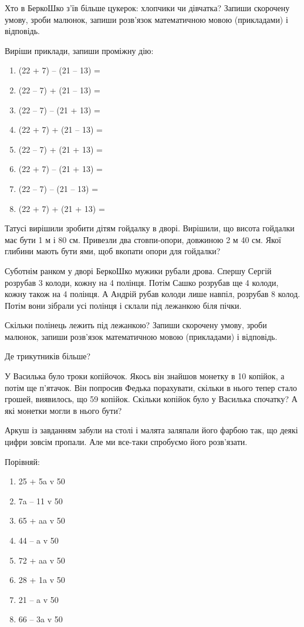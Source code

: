 Хто в БеркоШко з’їв більше цукерок: хлопчики чи дівчатка?
Запиши скорочену умову, зроби малюнок, запиши розв’язок
математичною мовою (прикладами) і відповідь.


\problem
Виріши приклади, запиши проміжну дію:
\begin{multicols}{2}
    \begin{enumerate}
        \item (22 + 7) – (21 – 13) = 
        \item (22 – 7) + (21 – 13) = 
        \item (22 – 7) – (21 + 13) = 
        \item (22 + 7) + (21 – 13) = 
        \item (22 – 7) + (21 + 13) = 
        \item (22 + 7) – (21 + 13) = 
        \item (22 – 7) – (21 – 13) = 
        \item (22 + 7) + (21 + 13) = 
    \end{enumerate}
\end{multicols}


\problem
Татусі вирішили зробити дітям гойдалку в дворі.
Вирішили, що висота гойдалки має бути 1 м і 80 см.
Привезли два стовпи-опори, довжиною 2 м 40 см.
Якої глибини мають бути ями, щоб вкопати опори для гойдалки?


\problem
Суботнім ранком у дворі БеркоШко мужики рубали дрова.
Спершу Сергій розрубав 3 колоди, кожну на 4 полінця.
Потім Сашко розрубав ще 4 колоди, кожну також на 4 полінця.
А Андрій рубав колоди лише навпіл, розрубав 8 колод.
Потім вони зібрали усі полінця і склали під лежанкою біля пічки.

Скільки полінець лежить під лежанкою?
Запиши скорочену умову, зроби малюнок,
запиши розв’язок математичною мовою (прикладами) і відповідь.


\problem
Де трикутників більше?


\problem
У Василька було троки копійочок.
Якось він знайшов монетку в 10 копійок, а потім ще п’ятачок.
Він попросив Федька порахувати, скільки в нього тепер стало грошей,
виявилось, що 59 копійок.
Скільки копійок було у Василька спочатку?
А які монетки могли в нього бути? 


\problem
Аркуш із завданням забули на столі і малята заляпали його фарбою так,
що деякі цифри зовсім пропали.
Але ми все-таки спробуємо його розв’язати.

Порівняй:
\begin{multicols}{2}
    \begin{enumerate}
        \item 25 + 5a v 50
        \item 7a – 11 v 50
        \item 65 + aa v 50
        \item 44 – a v 50
        \item 72 + aa v 50
        \item 28 + 1a v 50
        \item 21 – a v 50
        \item 66 – 3a v 50
    \end{enumerate}
\end{multicols}


